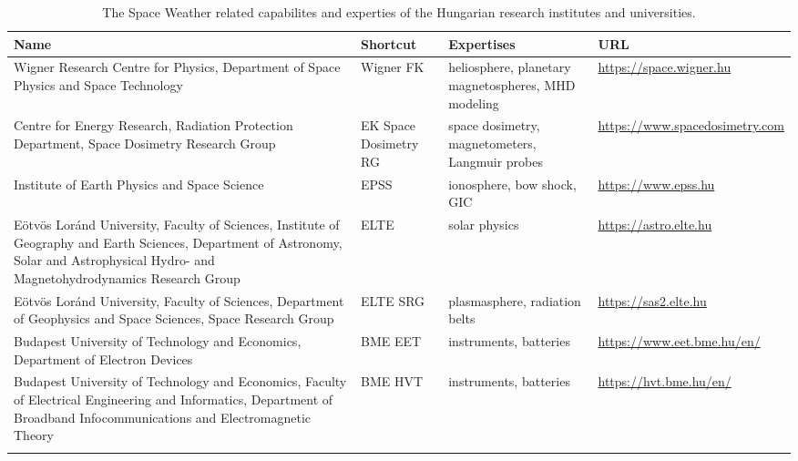 \documentclass[sn-aps]{sn-jnl}%
\begin{document}
\begin{table}[h]
\centering
\begin{tabular}[h]{p{4.5cm}p{0.75cm}p{2cm}p{2cm}}
Name & Shortcut & Expertises & URL \\
\hline
\hline
Wigner Research Centre for Physics, Department of Space Physics and Space Technology & Wigner FK & heliosphere, planetary magnetospheres, MHD modeling & \url{https://space.wigner.hu} \\
\hline
Centre for Energy Research, Radiation Protection Department, Space Dosimetry Research Group & EK Space Dosimetry RG& space dosimetry, magnetometers, Langmuir probes & \url{https://www.spacedosimetry.com} \\
\hline
Institute of Earth Physics and Space Science & EPSS & ionosphere, bow shock, GIC & \url{https://www.epss.hu} \\
\hline
E{\"o}tv{\"o}s Lor{\'a}nd University, Faculty of Sciences, Institute of Geography and Earth Sciences, Department of Astronomy, Solar and Astrophysical Hydro- and Magnetohydrodynamics Research Group & ELTE & solar physics & \url{https://astro.elte.hu} \\
\hline
E{\"o}tv{\"o}s Lor{\'a}nd University, Faculty of Sciences, Department of Geophysics and Space Sciences, Space Research Group & ELTE SRG & plasmasphere, radiation belts & \url{https://sas2.elte.hu} \\
\hline
Budapest University of Technology and Economics, Department of Electron Devices & BME EET & instruments, batteries & \url{https://www.eet.bme.hu/en/} \\
\hline
Budapest University of Technology and Economics, Faculty of Electrical Engineering and Informatics, Department of Broadband Infocommunications and Electromagnetic Theory & BME HVT & instruments, batteries & \url{https://hvt.bme.hu/en/} \\ \\
\end{tabular}
\caption[Hungarian SW experties]{The Space Weather related capabilites and experties of the Hungarian research institutes and universities.} \label{tab:hunexperties}
\end{table}




\pagebreak
\end{document}
